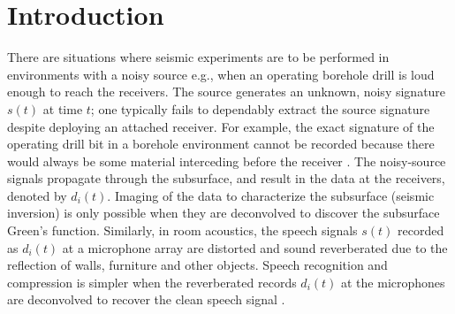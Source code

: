 \documentclass{article}
\theoremstyle{definition}
\begin{document}
\begin{abstract}
	

\end{abstract}


\section{Introduction}
There are situations 
where seismic experiments are to be performed in environments with a noisy source e.g., when an operating borehole drill is loud enough to reach the receivers.
%
The {source} generates an {unknown, noisy} signature $s(t)$ at time $t$; {one} typically fail{s} to 
dependably extract the source signature 
despite deploying an attached receiver.
%
For example, 
the exact signature of the 
operating drill bit 
in a borehole environment cannot be recorded because there would always be some material interceding 
before the receiver \citep{aminzadeh2013geophysics}.
%
The noisy-source signals propagate through the 
subsurface, and result in the data at the receivers, denoted by $d_i(t)$.
%
Imaging of the  
data to characterize the subsurface (seismic inversion) 
is only possible when 
they are {deconvolved to discover} %
the subsurface Green's function.
%
Similarly, 
in room acoustics,
the speech signals $s(t)$ recorded as $d_i(t)$ at a microphone array
are distorted and sound reverberated
due to the reflection of walls, furniture and other objects.
%
Speech recognition and compression is simpler 
when the reverberated records $d_i(t)$ 
at the microphones are deconvolved 
to recover the 
clean speech signal 
\citep{liu2001blind,yoshioka2012making}.
%
\end{document}
